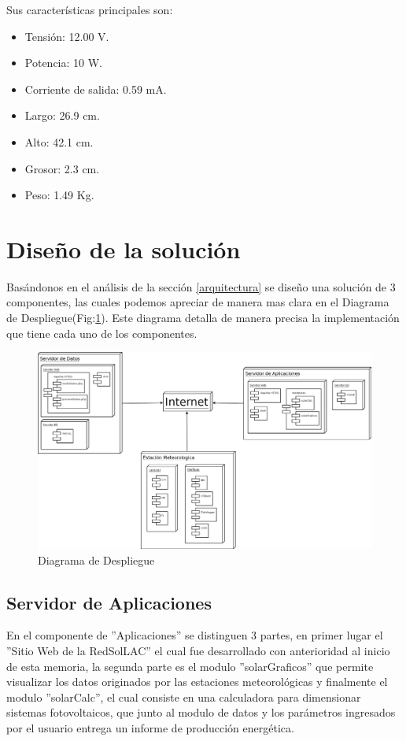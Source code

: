 Sus características principales son:\\

\begin{itemize}
\item Tensión: 12.00 V.
\item Potencia: 10 W.
\item Corriente de salida: 0.59 mA.
\item Largo: 26.9 cm.
\item Alto: 42.1 cm.
\item Grosor: 2.3 cm.
\item Peso: 1.49 Kg.
\end{itemize}

\section{Diseño de la solución}
Basándonos en el análisis de la sección \ref{arquitectura} se diseño una solución de 3 componentes, las cuales podemos apreciar de manera mas clara en el Diagrama de Despliegue(Fig:\ref{diagramaDespliegue}). Este diagrama detalla de manera precisa la implementación que tiene cada uno de los componentes.\\

\begin{figure}[h!]
        \centering
        \includegraphics[scale=0.25]{images/despliegue}
        \caption{Diagrama de Despliegue}
	\label{diagramaDespliegue}
\end{figure}

\subsection{Servidor de Aplicaciones}
En el componente de ''Aplicaciones'' se distinguen 3 partes, en primer lugar el ''Sitio Web de la RedSolLAC'' el cual fue desarrollado con anterioridad al inicio de esta memoria, la segunda parte es el modulo ''solarGraficos'' que permite visualizar los datos originados por las estaciones meteorológicas y finalmente el modulo ''solarCalc'', el cual consiste en una calculadora para dimensionar sistemas fotovoltaicos, que junto al modulo de datos y los parámetros ingresados por el usuario entrega un informe de producción energética.

